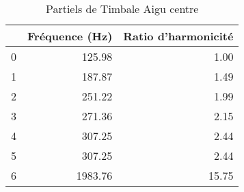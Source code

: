 \begin{table}
\centering
\caption{Partiels de Timbale Aigu centre}
\label{table:partiels-timbale-aigu-4.wav}
\begin{tabular}{lrr}
\toprule
{} &  Fréquence (Hz) &  Ratio d'harmonicité \\
\midrule
0 &          125.98 &                 1.00 \\
1 &          187.87 &                 1.49 \\
2 &          251.22 &                 1.99 \\
3 &          271.36 &                 2.15 \\
4 &          307.25 &                 2.44 \\
5 &          307.25 &                 2.44 \\
6 &         1983.76 &                15.75 \\
\bottomrule
\end{tabular}
\end{table}
